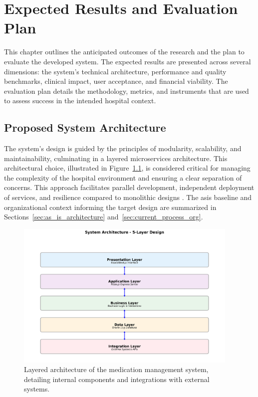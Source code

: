\chapter{Expected Results and Evaluation Plan}
\label{chap:ExpectedResults}

This chapter outlines the anticipated outcomes of the research and the plan to evaluate the developed system. The expected results are presented across several dimensions: the system's technical architecture, performance and quality benchmarks, clinical impact, user acceptance, and financial viability. The evaluation plan details the methodology, metrics, and instruments that are used to assess success in the intended hospital context.

\section{Proposed System Architecture}

The system's design is guided by the principles of modularity, scalability, and maintainability, culminating in a layered microservices architecture. This architectural choice, illustrated in Figure~\ref{fig:architecture}, is considered critical for managing the complexity of the hospital environment and ensuring a clear separation of concerns. This approach facilitates parallel development, independent deployment of services, and resilience compared to monolithic designs \cite{newman2015}. The as\-is baseline and organizational context informing the target design are summarized in Sections~\ref{sec:as_is_architecture} and~\ref{sec:current_process_org}.

\begin{figure}[htbp]
    \centering
    \includegraphics[width=0.95\textwidth]{images/generated/system_architecture.png}
    \caption{Layered architecture of the medication management system, detailing internal components and integrations with external systems.}
    \label{fig:architecture}
\end{figure}

